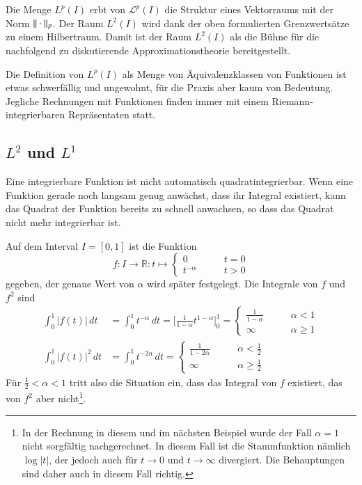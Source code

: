 Die Menge $L^p(I)$ erbt von $\mathcal{L}^p(I)$ die Struktur eines
Vektorraums mit der Norm $\|\mathstrut\cdot\mathstrut\|_p$.
Der Raum $L^2(I)$ wird dank der oben formulierten Grenzwertsätze zu
einem Hilbertraum.
Damit ist der Raum $L^2(I)$ als die Bühne für die nachfolgend zu diskutierende
Approximationstheorie bereitgestellt.

Die Definition von $L^p(I)$ als Menge von Äquivalenzklassen von Funktionen
ist etwas schwerfällig und ungewohnt, für die Praxis aber kaum von Bedeutung.
Jegliche Rechnungen mit Funktionen finden immer mit einem
Riemann-integrierbaren Repräsentaten statt.


\subsection{$L^2$ und $L^1$}
Eine integrierbare Funktion ist nicht automatisch
quadratintegrierbar.
Wenn eine Funktion gerade noch langsam genug anwächst, dass ihr
Integral existiert, kann das Quadrat der Funktion bereits zu schnell
anwachsen, so dass das Quadrat nicht mehr integrierbar ist.

\begin{beispiel}
Auf dem Interval $I=[0,1]$ ist die Funktion
\[
f\colon I\to \mathbb R: t\mapsto \begin{cases} 0&\qquad t=0\\
t^{-\alpha}&\qquad t > 0
\end{cases}
\]
gegeben, der genaue Wert von $\alpha$ wird später festgelegt.
Die Integrale von $f$ und $f^2$ sind
\begin{align*}
\int_0^1 |f(t)|\,dt
&=
\int_0^1 t^{-\alpha}\,dt
=
\biggl[\frac{1}{1-\alpha}t^{1-\alpha}\biggr]_0^1
=
\begin{cases}
\frac{1}{1-\alpha}&\qquad \alpha < 1\\
\infty&\qquad \alpha \ge 1
\end{cases}
\\
\int_0^1|f(t)|^2\,dt
&=
\int_0^1 t^{-2\alpha}\,dt
=
\begin{cases}
\frac{1}{1-2\alpha}&\qquad \alpha < \frac12\\
\infty&\qquad \alpha \ge \frac12
\end{cases}
\end{align*}
Für $\frac12<\alpha<1$ tritt also die Situation ein, dass das Integral
von $f$ existiert, das von $f^2$ aber nicht\footnote{In der Rechnung in
diesem und im nächsten Beispiel wurde der Fall $\alpha=1$ nicht sorgfältig
nachgerechnet.
In diesem Fall ist die Stammfunktion nämlich $\log|t|$, der jedoch
auch für $t\to 0$ und $t\to\infty$ divergiert.
Die Behauptungen sind daher auch in diesem Fall richtig.}.
\end{beispiel}

